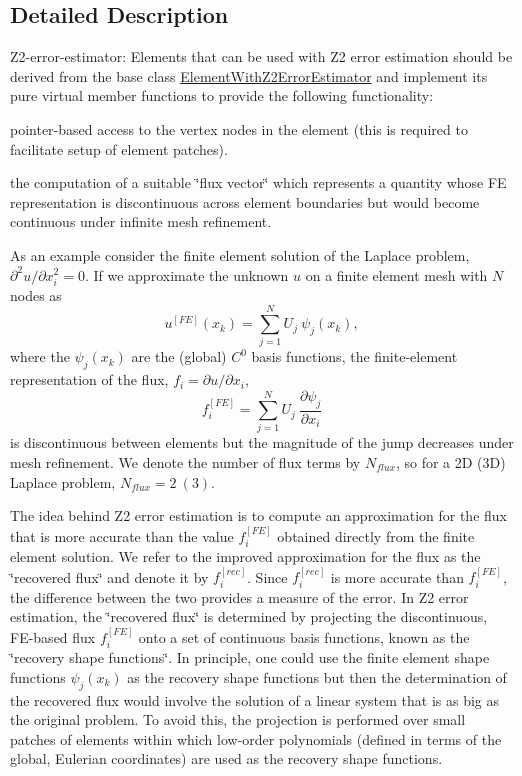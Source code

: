 \subsection{Detailed Description}
Z2-\/error-\/estimator\+: Elements that can be used with Z2 error estimation should be derived from the base class \hyperlink{classoomph_1_1ElementWithZ2ErrorEstimator}{Element\+With\+Z2\+Error\+Estimator} and implement its pure virtual member functions to provide the following functionality\+:
\begin{DoxyItemize}
\item pointer-\/based access to the vertex nodes in the element (this is required to facilitate setup of element patches).
\item the computation of a suitable \char`\"{}flux vector\char`\"{} which represents a quantity whose FE representation is discontinuous across element boundaries but would become continuous under infinite mesh refinement.
\end{DoxyItemize}

As an example consider the finite element solution of the Laplace problem, $ \partial^2 u/\partial x_i^2 = 0 $. If we approximate the unknown $ u $ on a finite element mesh with $ N $ nodes as \[ u^{[FE]}(x_k) = \sum_{j=1}^{N} U_j \ \psi_j(x_k), \] where the $ \psi_j(x_k) $ are the (global) $ C^0 $ basis functions, the finite-\/element representation of the flux, $ f_i = \partial u/\partial x_i $, \[ f_i^{[FE]} = \sum_{j=1}^{N} U_j \ \frac{\partial \psi_j}{\partial x_i} \] is discontinuous between elements but the magnitude of the jump decreases under mesh refinement. We denote the number of flux terms by $N_{flux}$, so for a 2D (3D) Laplace problem, $N_{flux}=2 \ (3).$

The idea behind Z2 error estimation is to compute an approximation for the flux that is more accurate than the value $ f_i^{[FE]} $ obtained directly from the finite element solution. We refer to the improved approximation for the flux as the \char`\"{}recovered flux\char`\"{} and denote it by $ f_i^{[rec]} $. Since $ f_i^{[rec]} $ is more accurate than $ f_i^{[FE]} $, the difference between the two provides a measure of the error. In Z2 error estimation, the \char`\"{}recovered flux\char`\"{} is determined by projecting the discontinuous, F\+E-\/based flux $ f_i^{[FE]} $ onto a set of continuous basis functions, known as the \char`\"{}recovery shape
functions\char`\"{}. In principle, one could use the finite element shape functions $ \psi_j(x_k) $ as the recovery shape functions but then the determination of the recovered flux would involve the solution of a linear system that is as big as the original problem. To avoid this, the projection is performed over small patches of elements within which low-\/order polynomials (defined in terms of the global, Eulerian coordinates) are used as the recovery shape functions.

